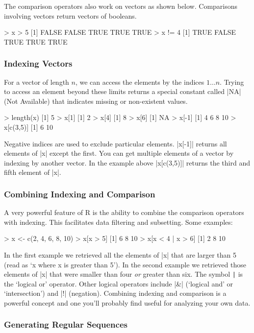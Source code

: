 The comparison operators also work on vectors as shown below.
Comparisons involving vectors return vectors of booleans.
%
\begin{R}
> x > 5
[1] FALSE FALSE  TRUE  TRUE  TRUE
> x != 4
[1]  TRUE FALSE  TRUE  TRUE  TRUE
\end{R}


\subsubsection{Indexing Vectors}

For a vector of length $n$, we can access the elements by the indices $1
\ldots n$. Trying to access an element beyond these limits returns a special
constant called |NA| (Not Available) that indicates missing or non-existent
values.
%
\begin{R}
> length(x)
[1] 5
> x[1]
[1] 2
> x[4]
[1] 8
> x[6]
[1] NA
> x[-1]
[1]  4  6  8 10
> x[c(3,5)]
[1]  6 10
\end{R}
%
Negative indices are used to exclude particular elements. |x[-1]| returns all
elements of |x| except the first. You can get multiple elements of a vector by
indexing by another vector. In the example above |x[c(3,5)]| returns the third
and fifth element of |x|.

\subsubsection{Combining Indexing and Comparison}

A very powerful feature of R is the ability to combine the comparison
operators with indexing. This facilitates data filtering and subsetting.
Some examples:
%
\begin{R}
> x <- c(2, 4, 6, 8, 10)
> x[x > 5]
[1]  6  8 10
> x[x < 4 | x > 6]
[1]  2  8 10
\end{R}
%

In the first example we retrieved all the elements of |x| that are larger than
5 (read as `x where x is greater than 5'). In the second example we retrieved
those elements of |x| that were smaller than four \emph{or} greater than six.
The symbol \lstinline!|! is the `logical or' operator. Other logical operators
include |&| (`logical and' or `intersection') and |!| (negation). Combining
indexing and comparison is a powerful concept and one you'll probably find
useful for analyzing your own data.

\subsubsection{Generating Regular Sequences}

